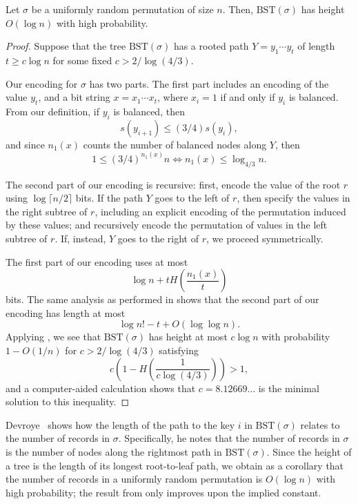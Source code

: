 \begin{thm}
  Let $\sigma$ be a uniformly random permutation of size $n$. Then,
  $\text{BST}(\sigma)$ has height $O(\log n)$ with high probability.
\end{thm}
\begin{proof}
  Suppose that the tree $\text{BST}(\sigma)$ has a rooted path $Y =
  y_1 \cdots y_t$ of length $t \geq c \log n$ for some fixed $c >
  2/\log (4/3)$.

  Our encoding for $\sigma$ has two parts. The first part includes an
  encoding of the value $y_t$, and a bit string $x = x_1 \cdots x_t$,
  where $x_i = 1$ if and only if $y_i$ is balanced. From our
  definition, if $y_i$ is balanced, then
  \[s(y_{i + 1}) \leq (3/4) s(y_i),\]
  and since $n_1(x)$ counts the number of balanced nodes along $Y$,
  then
  \[1 \leq (3/4)^{n_1(x)} n \iff n_1(x) \leq \log_{4/3} n.\]

  The second part of our encoding is recursive: first, encode the
  value of the root $r$ using $\log \lceil n/2 \rceil$ bits. If the
  path $Y$ goes to the left of $r$, then specify the values in the
  right subtree of $r$, including an explicit encoding of the
  permutation induced by these values; and recursively encode the
  permutation of values in the left subtree of $r$. If, instead, $Y$
  goes to the right of $r$, we proceed symmetrically.
 
  The first part of our encoding uses at most
  \[\log n + t H\left(\frac{n_1(x)}{t}\right)\]
  bits. The same analysis as performed in  shows that
  the second part of our encoding has length at most
  \[\log n! - t + O(\log \log n).\]
  Applying , we see that $\text{BST}(\sigma)$ has height
  at most $c \log n$ with probability $1 - O(1/n)$ for
  $c > 2/\log (4/3)$ satisfying
  \[c \left(1 - H\left(\frac{1}{c \log (4/3)}\right)\right) > 1,\]
  and a computer-aided calculation shows that $c = 8.12669...$ is the
  minimal solution to this inequality.
\end{proof}

\begin{rem}
  Devroye~\cite{devroye:records} shows how the length of the path to
  the key $i$ in $\text{BST}(\sigma)$ relates to the number of records
  in $\sigma$. Specifically, he notes that the number of records in
  $\sigma$ is the number of nodes along the rightmost path in
  $\text{BST}(\sigma)$. Since the height of a tree is the length of
  its longest root-to-leaf path, we obtain as a corollary that the
  number of records in a uniformly random permutation is $O(\log n)$
  with high probability; the result from  only
  improves upon the implied constant.
\end{rem}

